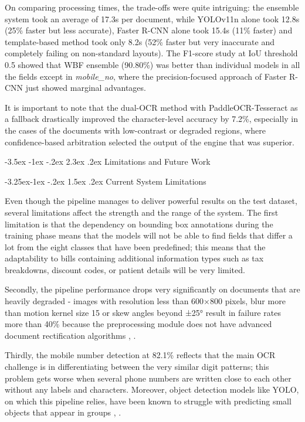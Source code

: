 \documentclass[conference,twocolumn]{IEEEtran}
\makeatletter
\renewcommand{\section}{\@startsection{section}{1}{\z@}%
  {-3.5ex \@plus -1ex \@minus -.2ex}%
  {2.3ex \@plus.2ex}%
  {\normalfont\large\bfseries\centering}}
\renewcommand{\subsection}{\@startsection{subsection}{2}{\z@}%
  {-3.25ex\@plus -1ex \@minus -.2ex}%
  {1.5ex \@plus .2ex}%
  {\normalfont\normalsize\bfseries\itshape}}
\makeatother
\begin{document}
On comparing processing times, the trade-offs were quite intriguing: the
ensemble system took an average of 17.3s per document, while YOLOv11n
alone took 12.8s (25\% faster but less accurate), Faster R-CNN alone
took 15.4s (11\% faster) and template-based method took only 8.2s (52\%
faster but very inaccurate and completely failing on non-standard
layouts). The F1-score study at IoU threshold 0.5 showed that WBF
ensemble (90.80\%) was better than individual models in all the fields
except in \textit{mobile\_no}, where the precision-focused approach of
Faster R-CNN just showed marginal advantages.

It is important to note that the dual-OCR method with
PaddleOCR-Tesseract as a fallback drastically improved the
character-level accuracy by 7.2\%, especially in the cases of the
documents with low-contrast or degraded regions, where confidence-based
arbitration selected the output of the engine that was
superior.

\section{Limitations and Future Work}

\subsection{Current System Limitations}

Even though the pipeline manages to deliver powerful results on the test
dataset, several limitations affect the strength and the range of the
system. The first limitation is that the dependency on bounding box
annotations during the training phase means that the models will not be
able to find fields that differ a lot from the eight classes that have
been predefined; this means that the adaptability to bills containing
additional information types such as tax breakdowns, discount codes, or
patient details will be very limited. \cite{ref2}

Secondly, the pipeline performance drops very significantly on documents
that are heavily degraded - images with resolution less than 600×800
pixels, blur more than motion kernel size 15 or skew angles beyond ±25°
result in failure rates more than 40\% because the preprocessing module
does not have advanced document rectification algorithms \cite{ref2},
\cite{ref5}.

Thirdly, the mobile number detection at 82.1\% reflects that the main
OCR challenge is in differentiating between the very similar digit
patterns; this problem gets worse when several phone numbers are written
close to each other without any labels and characters. Moreover, object
detection models like YOLO, on which this pipeline relies, have been
known to struggle with predicting small objects that appear in groups
\cite{ref5}, \cite{ref15}.
\end{document}

